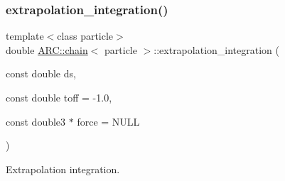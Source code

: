 \subsubsection{\texorpdfstring{extrapolation\+\_\+integration()}{extrapolation\_integration()}}
{\footnotesize\ttfamily template$<$class particle$>$ \\
double \hyperlink{classARC_1_1chain}{A\+R\+C\+::chain}$<$ particle $>$\+::extrapolation\+\_\+integration (\begin{DoxyParamCaption}\item[{const double}]{ds,  }\item[{const double}]{toff = {\ttfamily -\/1.0},  }\item[{const double3 $\ast$}]{force = {\ttfamily NULL} }\end{DoxyParamCaption})\hspace{0.3cm}{\ttfamily [inline]}}



Extrapolation integration. 

